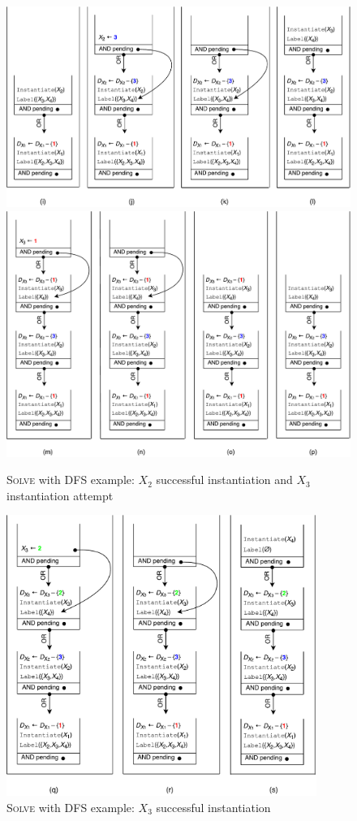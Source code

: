 \documentclass{ws-ijait}
\begin{document}
\begin{enumerate}
\begin{figure}
  \includegraphics[width=\textwidth]{figures/stacks/ijkl}
  \includegraphics[width=\textwidth]{figures/stacks/mnop}
  \caption{\textsc{Solve} with DFS example: $X_2$ successful
           instantiation and $X_3$ instantiation
           attempt\label{i2p}}
\end{figure}

\begin{figure}
  \centering
  \includegraphics[width=0.9\textwidth]{figures/stacks/qrs}
  \caption{\textsc{Solve} with DFS example: $X_3$ successful
           instantiation\label{qrs}}
\end{figure}


\end{enumerate}
\end{document}

